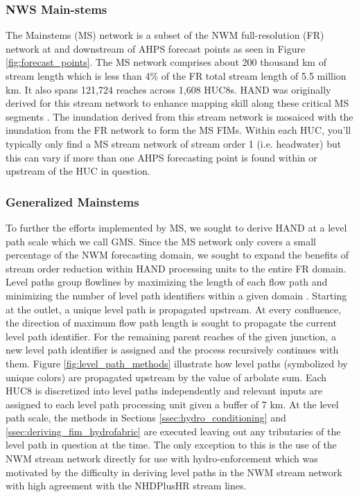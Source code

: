 \documentclass[draft]{dependencies/agujournal2019}
\begin{document}
\subsubsection{NWS Main-stems}
\label{sssec:nws_mainstems}
%
The Mainstems (MS) network is a subset of the NWM full-resolution (FR) network at and downstream of AHPS forecast points as seen in Figure \ref{fig:forecast_points}.
The MS network comprises about 200 thousand km of stream length which is less than 4\% of the FR total stream length of 5.5 million km.
It also spans 121,724 reaches across 1,608 HUC8s.
HAND was originally derived for this stream network to enhance mapping skill along these critical MS segments \cite{djokic2019arc}. 
The inundation derived from this stream network is mosaiced with the inundation from the FR network to form the MS FIMs. 
Within each HUC, you'll typically only find a MS stream network of stream order 1 (i.e. headwater) but this can vary if more than one AHPS forecasting point is found within or upstream of the HUC in question.
%
\subsubsection{Generalized Mainstems}
\label{sssec:generalized_mainstems}
%
To further the efforts implemented by MS, we sought to derive HAND at a level path scale which we call GMS.
Since the MS network only covers a small percentage of the NWM forecasting domain, we sought to expand the benefits of stream order reduction within HAND processing units to the entire FR domain.
Level paths group flowlines by maximizing the length of each flow path and minimizing the number of level path identifiers within a given domain \cite{moore2019user,mckay2012nhdplus}. 
Starting at the outlet, a unique level path is propagated upstream. 
At every confluence, the direction of maximum flow path length is sought to propagate the current level path identifier.
For the remaining parent reaches of the given junction, a new level path identifier is assigned and the process recursively continues with them.
Figure \ref{fig:level_path_methods} illustrate how level paths (symbolized by unique colors) are propagated upstream by the value of arbolate sum.
Each HUC8 is discretized into level paths independently and relevant inputs are assigned to each level path processing unit given a buffer of 7 km.
At the level path scale, the methods in Sections \ref{ssec:hydro_conditioning} and \ref{ssec:deriving_fim_hydrofabric} are executed leaving out any tributaries of the level path in question at the time.
The only exception to this is the use of the NWM stream network directly for use with hydro-enforcement which was motivated by the difficulty in deriving level paths in the NWM stream network with high agreement with the NHDPlusHR stream lines.
\end{document}
